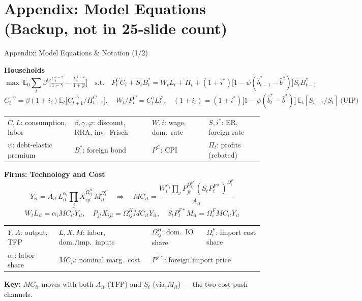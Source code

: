 \section*{Appendix: Model Equations (Backup, not in 25-slide count)}
\begin{frame}{Appendix: Model Equations \& Notation (1/2)}
\hypertarget{modeleqns}{}

{\scriptsize\textbf{Households}}
\vspace{-2pt}
{\tiny
\[
\max\ \mathbb{E}_0\sum_t \beta^t\Big[\tfrac{C_t^{1-\gamma}}{1-\gamma} - \tfrac{L_t^{1+\varphi}}{1+\varphi}\Big]
\quad\text{s.t.}\quad
P^C_tC_t + S_tB^*_t = W_tL_t + \Pi_t + (1{+}i^*)\big[1{-}\psi(\hat b^*_{t-1}{-}\bar b^*)\big]S_tB^*_{t-1}
\]
\vspace{-8pt}
\[
C_t^{-\gamma} = \beta(1{+}i_t)\mathbb{E}_t\big[C_{t+1}^{-\gamma}/\Pi^C_{t+1}\big],\quad
W_t/P^C_t = C_t^{\gamma}L_t^{\varphi},\quad
(1{+}i_t) = (1{+}i^*)\big[1{-}\psi(\hat b^*_t{-}\bar b^*)\big]\,\mathbb{E}_t[S_{t+1}/S_t]\ \text{(UIP)}
\]}
{\tiny
\begin{tabular}{@{}llll@{}}
$C,L$: consumption, labor & $\beta,\gamma,\varphi$: discount, RRA, inv.\ Frisch & $W,i$: wage, dom.\ rate & $S,i^*$: ER, foreign rate \\
$\psi$: debt-elastic premium & $B^*$: foreign bond & $P^C$: CPI & $\Pi_t$: profits (rebated) \\
\end{tabular}}

\vspace{10pt}
{\scriptsize\textbf{Firms: Technology and Cost}}
\vspace{-2pt}
{\tiny
\[
Y_{it}=A_{it}\,L_{it}^{\alpha_i}\prod_j X_{ijt}^{\Omega^H_{ij}}\,M_{it}^{\Omega^F_i}
\quad\Rightarrow\quad
MC_{it}=\frac{W_t^{\alpha_i}\prod_j P_{jt}^{\Omega^H_{ij}}\,(S_tP^{F*}_t)^{\Omega^F_i}}{A_{it}}
\]
\vspace{-6pt}
\[
W_tL_{it}=\alpha_i MC_{it}Y_{it},\quad P_{jt}X_{ijt}=\Omega^H_{ij}MC_{it}Y_{it},\quad S_tP^{F*}_tM_{it}=\Omega^F_i MC_{it}Y_{it}
\]}
{\tiny
\begin{tabular}{@{}llll@{}}
$Y,A$: output, TFP & $L,X,M$: labor, dom./imp.\ inputs & $\Omega^H_{ij}$: dom.\ IO share & $\Omega^F_i$: import cost share \\
$\alpha_i$: labor share & $MC_{it}$: nominal marg.\ cost & \multicolumn{2}{l}{$P^{F*}$: foreign import price} \\
\end{tabular}}

\vspace{6pt}
{\footnotesize \textbf{Key:} $MC_{it}$ moves with both $A_{it}$ (TFP) and $S_t$ (via $M_{it}$) --- the two cost-push channels.}

\end{frame}

